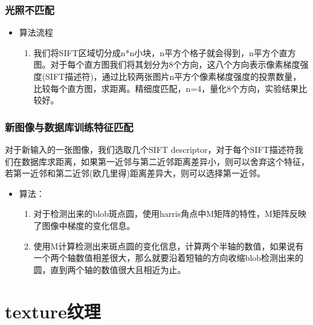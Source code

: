 \documentclass[UTF8]{ctexart}
\begin{document}
\subsubsection{光照不匹配}

\begin{itemize}
    \item 算法流程
    \begin{enumerate}
        \item 我们将SIFT区域切分成n*n小块，n平方个格子就会得到，n平方个直方图。对于每个直方图我们将其划分为8个方向，这八个方向表示像素梯度强度(SIFT描述符)，通过比较两张图片n平方个像素梯度强度的投票数量，比较每个直方图，求距离。精细度匹配，n=4，量化8个方向，实验结果比较好。
    \end{enumerate}
\end{itemize}

\subsubsection{新图像与数据库训练特征匹配}

对于新输入的一张图像，我们选取几个SIFT descriptor，对于每个SIFT描述符我们在数据库求距离，如果第一近邻与第二近邻距离差异小，则可以舍弃这个特征，若第一近邻和第二近邻(欧几里得)距离差异大，则可以选择第一近邻。

\begin{itemize}
    \item 算法：
    \begin{enumerate}
        \item 对于检测出来的blob斑点圆，使用harris角点中M矩阵的特性，M矩阵反映了图像中梯度的变化信息。
        \item 使用M计算检测出来斑点圆的变化信息，计算两个半轴的数值，如果说有一个两个轴数值相差很大，那么就要沿着短轴的方向收缩blob检测出来的圆，直到两个轴的数值很大且相近为止。
    \end{enumerate}
\end{itemize}

\section{texture纹理}
\end{document}
